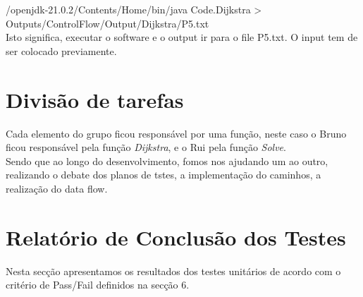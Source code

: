\documentclass{article}
\begin{document}
/openjdk-21.0.2/Contents/Home/bin/java Code.Dijkstra \textgreater{} Outputs/ControlFlow/Output/Dijkstra/P5.txt\\

Isto significa, executar o software e o output ir para o file P5.txt. O input tem de ser colocado previamente.

\section{Divisão de tarefas}

\texttt{}\par Cada elemento do grupo ficou responsável por uma função, neste caso o Bruno ficou responsável pela função \textit{Dijkstra}, e o Rui pela função \textit{Solve}.\\

Sendo que ao longo do desenvolvimento, fomos nos ajudando um ao outro, realizando o debate dos planos de tstes, a implementação do caminhos, a realização do data flow.


\clearpage
\section{Relatório de Conclusão dos Testes}
\texttt{}\par Nesta secção apresentamos os resultados dos testes unitários de acordo com o critério de Pass/Fail definidos na secção 6.
\end{document}
